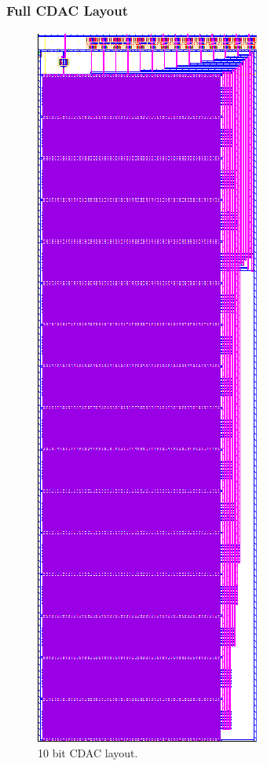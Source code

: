 			\subsubsection{Full CDAC Layout}
				\begin{figure}[htb!]
				        \centering
				        \includegraphics[height=0.85\textheight, angle=0]{./figs/layout/layout_cdac_10b}
				    \caption{10 bit CDAC layout.}
				\end{figure}
			\FloatBarrier\pagebreak

